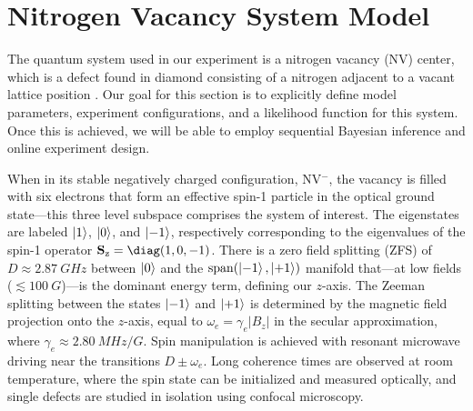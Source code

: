 \documentclass[aps,nofootinbib,twocolumn,superscriptaddress]{revtex4}
\begin{document}
\section{Nitrogen Vacancy System Model}
\label{sec:system-model}

The quantum system used in our experiment is a nitrogen vacancy (NV) center,
which is a defect found in diamond consisting of a nitrogen adjacent to
a vacant lattice position \cite{doherty_nitrogen-vacancy_2013}.
Our goal for this section is to explicitly define model parameters, experiment configurations, and a likelihood function for this system.
Once this is achieved, we will be able to employ sequential
Bayesian inference and online experiment design.

When in its stable negatively charged configuration, NV$^-$,
the vacancy is filled with
six electrons that form an effective spin-1 particle in the optical
ground state---this three level subspace comprises the system of interest.
The eigenstates are labeled $\ket{1}$, $\ket{0}$, and $\ket{-1}$, respectively
corresponding to the eigenvalues of the spin-1 operator $\Sz=\diag(1,0,-1)$.
There is a zero field splitting (ZFS) of $D\approx\SI{2.87}{GHz}$
between $\ket{0}$ and the $\operatorname{span}(\ket{-1},\ket{+1})$ manifold
that---at low fields ($\lesssim\SI{100}{G}$)---is the dominant energy term,
defining our $z$-axis.
The Zeeman splitting between the states $\ket{-1}$ and $\ket{+1}$
is determined by the magnetic field projection onto the $z$-axis, equal to
$\omega_e=\gamma_e |B_z|$ in the secular approximation,
where $\gamma_e\approx\SI{2.80}{MHz/G}$.
Spin manipulation is achieved with resonant microwave driving near
the transitions $D\pm\omega_e$.
Long coherence times are observed at room temperature, where
the spin state can be initialized and measured optically, and single
defects are studied in isolation using confocal microscopy.
\end{document}
